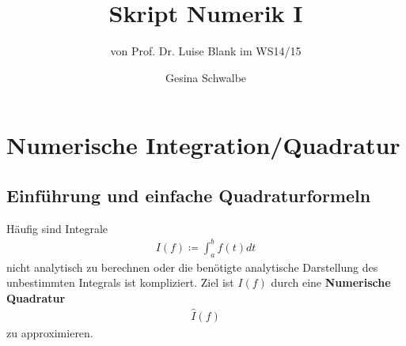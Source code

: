 \documentclass[ngerman,fontsize=11pt, paper=a4, parskip=half, titlepage=true, toc=bib]{scrbook}
\theoremstyle{definition}
\theoremstyle{plain}
\newcommand{\sectione}[1]{ \setcounter{equation}{0}\section{#1}}
\begin{document}
\frontmatter	%

\title{Skript Numerik I}
\subtitle{von Prof. Dr. Luise Blank im WS14/15}
\author{Gesina Schwalbe}
\maketitle

\tableofcontents

\mainmatter		%
















\chapter{Numerische Integration/Quadratur}

\sectione{Einführung und einfache Quadraturformeln}
Häufig sind Integrale
\begin{gather*}
  I(f) \coloneqq \int_a^bf(t)dt
\end{gather*}
nicht analytisch zu berechnen
oder die benötigte analytische Darstellung
des unbestimmten Integrals ist kompliziert.
Ziel ist $I(f)$ durch eine 
\textbf{Numerische Quadratur}
\begin{gather*}
  \hat{I}(f)
\end{gather*}
zu approximieren.
\end{document}
